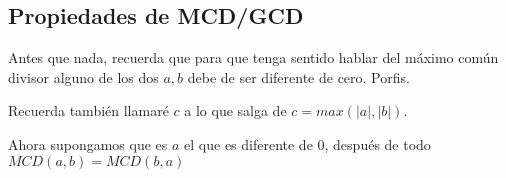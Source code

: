 \documentclass[12pt, fleqn]{report}                             %
\begin{document}
        \clearpage
        \subsection{Propiedades de MCD/GCD}

            Antes que nada, recuerda que para que tenga sentido hablar del máximo común divisor
            alguno de los dos $a,b$ debe de ser diferente de cero. Porfis.

            Recuerda también llamaré $c$ a lo que salga de $c=max(|a|,|b|)$.

            Ahora supongamos que es $a$ el que es diferente de 0, después de todo
            $MCD(a,b) = MCD(b,a)$
\end{document}
